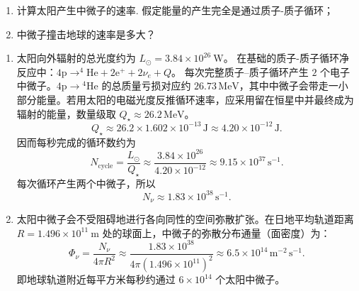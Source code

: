 \begin{exercise}\label{ex:29.36}
\begin{enumerate}
  \item[(a)] 计算太阳产生中微子的速率. 假定能量的产生完全是通过质子-质子循环；
  \item[(b)] 中微子撞击地球的速率是多大？
\end{enumerate}
\end{exercise}
\begin{solution}
\begin{enumerate}
    \item[(a)] 太阳向外辐射的总光度约为 $L_\odot = 3.84 \times 10^{26} \ \mathrm{W}$。
    在基础的质子-质子循环净反应中：$4\mathrm{p} \rightarrow ^4\mathrm{He} + 2\mathrm{e}^+ + 2\nu_e + Q$。
    每次完整质子--质子循环产生 $2$ 个电子中微子。$4\mathrm{p}\rightarrow{}^4\mathrm{He}$ 的总质量亏损对应约 $26.73\,\mathrm{MeV}$，其中中微子会带走一小部分能量。若用太阳的电磁光度反推循环速率，应采用留在恒星中并最终成为辐射的能量，数量级取 $Q_\star\approx26.2\,\mathrm{MeV}$。
    $$ Q_\star \approx 26.2\times1.602\times10^{-13}\,\mathrm{J}
       \approx 4.20\times10^{-12}\,\mathrm{J}. $$
    因而每秒完成的循环数约为
    $$ N_{\text{cycle}}=\frac{L_\odot}{Q_\star}
       \approx\frac{3.84\times10^{26}}{4.20\times10^{-12}}
       \approx9.15\times10^{37}\,\mathrm{s^{-1}}. $$
    每次循环产生两个中微子，所以
    $$ N_\nu\approx1.83\times10^{38}\,\mathrm{s^{-1}}. $$

    \item[(b)] 太阳中微子会不受阻碍地进行各向同性的空间弥散扩张。在日地平均轨道距离 $R = 1.496 \times 10^{11} \ \mathrm{m}$ 处的球面上，中微子的弥散分布通量（面密度）为：
    $$ \Phi_\nu = \frac{N_\nu}{4\pi R^2}
       \approx \frac{1.83\times10^{38}}{4\pi(1.496\times10^{11})^2}
       \approx 6.5\times10^{14}\,\mathrm{m^{-2}\,s^{-1}}. $$
    即地球轨道附近每平方米每秒约通过 $6\times10^{14}$ 个太阳中微子。
\end{enumerate}
\end{solution}

